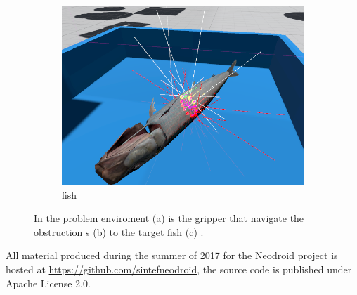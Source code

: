 \begin{figure}
\begin{subfigure}[t]{0.33\textwidth}
\label{fig:obstructions-sim}
\end{subfigure}%
    \hfill
\begin{subfigure}[t]{0.33\textwidth}
\centering
\includegraphics[width=\linewidth]{figures/target}
\caption{fish}
\label{fig:fish-sim}
\end{subfigure}%

\caption{In the problem enviroment 
(a) %
is the gripper that navigate the obstruction s
(b) %
to the target fish 
(c)%
.}
\label{fig:problem-environment}
\end{figure}

All material produced during the summer of 2017 for the Neodroid project is hosted at \url{https://github.com/sintefneodroid}, the source code is published under Apache License 2.0.